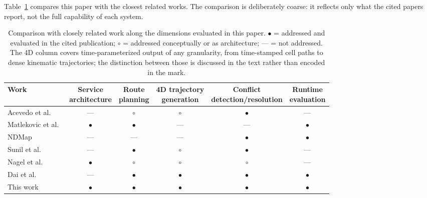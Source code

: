 Table~\ref{tab:related_comparison} compares this paper with the closest related works. The comparison is deliberately coarse: it reflects only what the cited papers report, not the full capability of each system.

\begin{table}[H]
    \centering
    \caption{Comparison with closely related work along the dimensions evaluated in this paper. \(\bullet\) = addressed and evaluated in the cited publication; \(\circ\) = addressed conceptually or as architecture; --- = not addressed. The 4D column covers time-parameterized output of any granularity, from time-stamped cell paths to dense kinematic trajectories; the distinction between those is discussed in the text rather than encoded in the mark.}
    \label{tab:related_comparison}
    \small
    \begin{tabularx}{\textwidth}{Xccccc}
        \toprule
        Work & \makecell{Service\\architecture} & \makecell{Route\\planning} & \makecell{4D trajectory\\generation} & \makecell{Conflict\\detection/resolution} & \makecell{Runtime\\evaluation} \\
        \midrule
        Acevedo et al.~\cite{acevedo_4d_grids_u_space} & --- & \(\circ\) & \(\circ\) & \(\bullet\) & --- \\
        Matlekovic et al.~\cite{matlekovic2020uav} & \(\bullet\) & \(\bullet\) & --- & --- & \(\bullet\) \\
        NDMap~\cite{NDMap} & --- & --- & --- & \(\bullet\) & \(\bullet\) \\
        Sunil et al.~\cite{sunil2015metropolis} & --- & \(\bullet\) & \(\circ\) & \(\bullet\) & --- \\
        Nagel et al.~\cite{nagel2026microservice} & \(\bullet\) & \(\circ\) & \(\circ\) & \(\circ\) & --- \\
        Dai et al.~\cite{dai2021_conflict_free_4d_uam} & --- & \(\bullet\) & \(\bullet\) & \(\bullet\) & \(\bullet\) \\
        This work & \(\bullet\) & \(\bullet\) & \(\bullet\) & \(\bullet\) & \(\bullet\) \\
        \bottomrule
    \end{tabularx}
\end{table}

